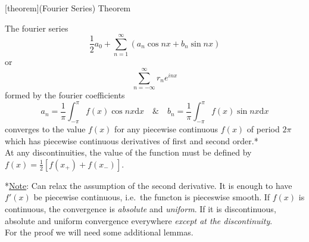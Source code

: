 \documentclass[12pt]{report}
\theoremstyle{definition}
\begin{document}
[theorem]{(Fourier Series) Theorem}
\begin{fourier series}%
\label{thm:fourierSeriesTheorem}
    The fourier series\[
        \frac{1}{2}a_0 + \sum_{n=1}^{\infty} (a_n \cos{nx} + b_n \sin{nx})
    \]or\[
        \sum_{n=-\infty}^{\infty} r_n e^{inx}
    \] formed by the fourier coefficients \[
    a_n = \frac{1}{\pi}\int_{-\pi}^{\pi} f(x)\cos{nx}\mathrm{d}x \quad \text{\&} \quad
    b_n = \frac{1}{\pi}\int_{-\pi}^{\pi} f(x)\sin{nx}\mathrm{d}x
    \]
    converges to the value $f(x)$ for any piecewise continuous $f(x)$ of period $2\pi$ 
    which has piecewise continuous derivatives of first and second order.*
    \\At any discontinuities, the value of the function must be defined by $f(x) = \frac{1}{2}[f(x_+) + f(x_-)]$.
\end{fourier series}
*\underline{Note}: Can relax the assumption of the second derivative. 
It is enough to have $f'(x)$ be piecewise continuous, i.e.\ the functon is pieceswise smooth.
If $f(x)$ is continuous, the convergence is \emph{absolute} and \emph{uniform}. 
If it is discontinuous, absolute and uniform convergence everywhere \emph{except at the discontinuity}.
\medskip
\\For the proof we will need some additional lemmas.
\end{document}
